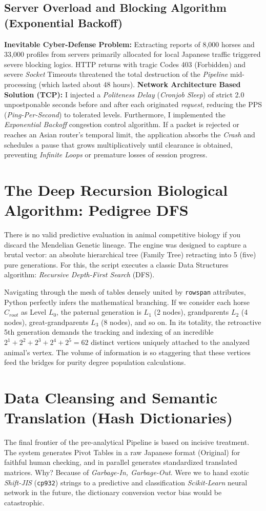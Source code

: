 \documentclass[12pt,a4paper]{article}
\begin{document}
\subsection{Server Overload and Blocking Algorithm (Exponential Backoff)}
\textbf{Inevitable Cyber-Defense Problem:} Extracting reports of 8,000 horses and 33,000 profiles from servers primarily allocated for local Japanese traffic triggered severe blocking logics. HTTP returns with tragic Codes 403 (Forbidden) and severe \textit{Socket} Timeouts threatened the total destruction of the \textit{Pipeline} mid-processing (which lasted about 48 hours).
\textbf{Network Architecture Based Solution (TCP):} I injected a \textit{Politeness Delay} (\textit{Cronjob Sleep}) of strict 2.0 unpostponable seconds before and after each originated \textit{request}, reducing the PPS (\textit{Ping-Per-Second}) to tolerated levels. Furthermore, I implemented the \textit{Exponential Backoff} congestion control algorithm. If a packet is rejected or reaches an Asian router's temporal limit, the application absorbs the \textit{Crash} and schedules a pause that grows multiplicatively until clearance is obtained, preventing \textit{Infinite Loops} or premature losses of session progress.

\section{The Deep Recursion Biological Algorithm: Pedigree DFS}
There is no valid predictive evaluation in animal competitive biology if you discard the Mendelian Genetic lineage.
The engine was designed to capture a brutal vector: an absolute hierarchical tree (Family Tree) retracting into 5 (five) pure generations. For this, the script executes a classic Data Structures algorithm: \textit{Recursive Depth-First Search} (DFS).

Navigating through the mesh of tables densely united by \texttt{rowspan} attributes, Python perfectly infers the mathematical branching. If we consider each horse $C_{root}$ as Level $L_0$, the paternal generation is $L_1$ (2 nodes), grandparents $L_2$ (4 nodes), great-grandparents $L_3$ (8 nodes), and so on. In its totality, the retroactive 5th generation demands the tracking and indexing of an incredible $2^1 + 2^2 + 2^3 + 2^4 + 2^5 = 62$ distinct vertices uniquely attached to the analyzed animal's vertex. The volume of information is so staggering that these vertices feed the bridges for purity degree population calculations.

\section{Data Cleansing and Semantic Translation (Hash Dictionaries)}
The final frontier of the pre-analytical Pipeline is based on incisive treatment.
The system generates Pivot Tables in a raw Japanese format (Original) for faithful human checking, and in parallel generates standardized translated matrices. Why? Because of \textit{Garbage-In, Garbage-Out}. Were we to hand exotic \textit{Shift-JIS} (\texttt{cp932}) strings to a predictive and classification \textit{Scikit-Learn} neural network in the future, the dictionary conversion vector bias would be catastrophic.
\end{document}
